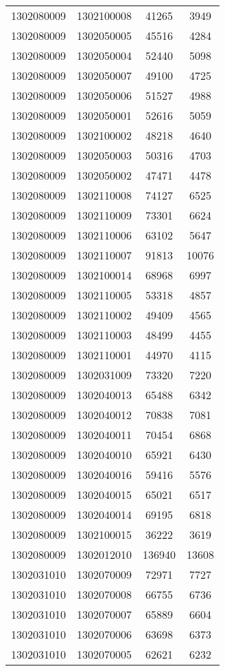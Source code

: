 \begin{longtable}{llcc}
1302080009 & 1302100008 & 41265 & 3949\\
1302080009 & 1302050005 & 45516 & 4284\\
1302080009 & 1302050004 & 52440 & 5098\\
1302080009 & 1302050007 & 49100 & 4725\\
1302080009 & 1302050006 & 51527 & 4988\\
1302080009 & 1302050001 & 52616 & 5059\\
1302080009 & 1302100002 & 48218 & 4640\\
1302080009 & 1302050003 & 50316 & 4703\\
1302080009 & 1302050002 & 47471 & 4478\\
1302080009 & 1302110008 & 74127 & 6525\\
1302080009 & 1302110009 & 73301 & 6624\\
1302080009 & 1302110006 & 63102 & 5647\\
1302080009 & 1302110007 & 91813 & 10076\\
1302080009 & 1302100014 & 68968 & 6997\\
1302080009 & 1302110005 & 53318 & 4857\\
1302080009 & 1302110002 & 49409 & 4565\\
1302080009 & 1302110003 & 48499 & 4455\\
1302080009 & 1302110001 & 44970 & 4115\\
1302080009 & 1302031009 & 73320 & 7220\\
1302080009 & 1302040013 & 65488 & 6342\\
1302080009 & 1302040012 & 70838 & 7081\\
1302080009 & 1302040011 & 70454 & 6868\\
1302080009 & 1302040010 & 65921 & 6430\\
1302080009 & 1302040016 & 59416 & 5576\\
1302080009 & 1302040015 & 65021 & 6517\\
1302080009 & 1302040014 & 69195 & 6818\\
1302080009 & 1302100015 & 36222 & 3619\\
1302080009 & 1302012010 & 136940 & 13608\\
1302031010 & 1302070009 & 72971 & 7727\\
1302031010 & 1302070008 & 66755 & 6736\\
1302031010 & 1302070007 & 65889 & 6604\\
1302031010 & 1302070006 & 63698 & 6373\\
1302031010 & 1302070005 & 62621 & 6232\\

\end{longtable}
